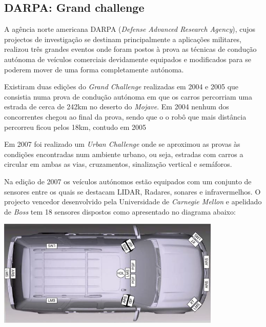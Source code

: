 \subsection{DARPA: Grand challenge}
A agência norte americana DARPA (\emph{Defense Advanced Research Agency}), cujos projectos de
investigação se destinam principalmente a aplicações militares, realizou três grandes
eventos onde foram postos à prova as técnicas de condução autónoma de veículos
comerciais devidamente equipados e modificados para se poderem mover de uma forma
completamente autónoma.  

Existiram duas edições do \emph{Grand Challenge} realizadas em 2004 e 2005 que consistia
numa prova de condução autónoma em que os carros percorriam uma estrada de cerca
de 242km no deserto do \emph{Mojave}. Em 2004 nenhum dos concorrentes chegou ao final da
prova, sendo que o o robô que mais distância percorreu ficou pelos 18km, contudo em 2005

Em 2007 foi realizado um \emph{Urban Challenge} onde se aproximou as provas às condições
encontradas num ambiente urbano, ou seja, estradas com carros a circular em ambas as
vias, cruzamentos, sinalização vertical  e semáforos.

Na edição de 2007 os veículos autónomos estão equipados com um conjunto de sensores
 entre os quais se destacam LIDAR, Radares, sonares e infravermelhos. O projecto
vencedor desenvolvido pela Universidade de \emph{Carnegie Mellon} e apelidado de
 \emph{Boss} \cite{Urmson:2008:ADU:1395073.1395077} tem
18 sensores dispostos como apresentado no diagrama abaixo:

\begin{center}
	\includegraphics[width=0.80\textwidth]{figures/boss_sensors.png}
	\label{fig:2}
\end{center}

